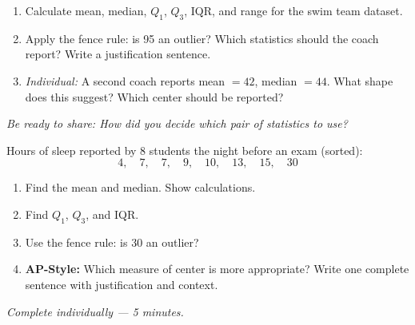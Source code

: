 \documentclass[aspectratio=169, 11pt]{beamer}
\begin{document}
{
\begin{frame}[t, plain]
  \vspace{1em}%
  \hspace{0.55cm}%
  \begin{minipage}{0.9\textwidth}
    \small
    \begin{enumerate}
      \setlength{\itemsep}{0.6em}\setlength{\topsep}{0em}
      \item[\textbf{Part 1}] Calculate mean, median, $Q_1$, $Q_3$, IQR, and range
            for the swim team dataset.
      \item[\textbf{Part 2}] Apply the fence rule: is 95 an outlier? Which statistics
            should the coach report? Write a justification sentence.
      \item[\textbf{Part 3}] \textit{Individual:} A second coach reports mean $= 42$,
            median $= 44$. What shape does this suggest? Which center should be reported?
    \end{enumerate}

    \vspace{0.5cm}
    {\color{navy}\itshape\small
      Be ready to share: How did you decide which pair of statistics to use?}
  \end{minipage}
\end{frame}
}

{
\begin{frame}[t, plain]
  \vspace{1em}%
  \hspace{0.55cm}%
  \begin{minipage}{0.9\textwidth}
    \small
    Hours of sleep reported by 8 students the night before an exam (sorted):
    \[4,\quad 7,\quad 7,\quad 9,\quad 10,\quad 13,\quad 15,\quad 30\]

    \vspace{0.4em}
    \begin{enumerate}
      \setlength{\itemsep}{0.5em}\setlength{\topsep}{0em}
      \item Find the mean and median. Show calculations.
      \item Find $Q_1$, $Q_3$, and IQR.
      \item Use the fence rule: is 30 an outlier?
      \item \textbf{AP-Style:} Which measure of center is more appropriate?
            Write one complete sentence with justification and context.
    \end{enumerate}

    \vspace{0.4cm}
    {\color{navy}\itshape\small
      Complete individually --- 5 minutes.}
  \end{minipage}
\end{frame}
}
\end{document}
